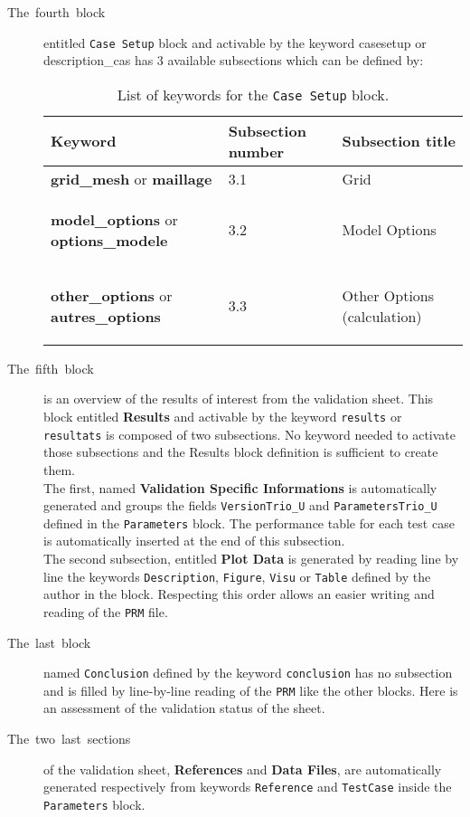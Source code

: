 \begin{description}
\item [{The~fourth~block}] entitled \texttt{Case Setup} block and activable
by the keyword casesetup or description\_cas has 3 available subsections
which can be defined by:\smallskip\newline
\begin{table}[H]
\begin{centering}
\begin{tabular*}{16cm}{m{4.5cm} m{3cm} m{7.5cm}}
\hline 
\textbf{Keyword} & \textbf{Subsection number} & \textbf{Subsection title}\tabularnewline
\hline 
\textbf{grid\_mesh} or \textbf{maillage} & 3.1 & Grid\tabularnewline
\begin{flushleft}\textbf{model\_options} or \textbf{options\_modele}\end{flushleft} & 3.2 & Model Options\tabularnewline
\begin{flushleft}\textbf{other\_options} or \textbf{autres\_options}\end{flushleft} & 3.3 & Other Options (calculation)\tabularnewline
\hline 
\end{tabular*}
\par\end{centering}
\caption{\label{tab:List-of-keyword-casesetup}List of keywords for the \texttt{Case Setup} block.}
\end{table}

\item [{The~fifth~block}] is an overview of the results of interest from
the validation sheet. This block entitled \textbf{Results} and activable
by the keyword \texttt{results} or \texttt{resultats} is composed
of two subsections. No keyword needed to activate those subsections
and the Results block definition is sufficient to create them.\\
The first, named \textbf{Validation Specific Informations} is automatically
generated and groups the fields \texttt{VersionTrio\_U} and \texttt{ParametersTrio\_U}
defined in the \texttt{Parameters} block. The performance table for
each test case is automatically inserted at the end of this subsection.\\
The second subsection, entitled \textbf{Plot Data} is generated by
reading line by line the keywords \texttt{Description}, \texttt{Figure},
\texttt{Visu} or \texttt{Table} defined by the author in the block.
Respecting this order allows an easier writing and reading of the \texttt{PRM}
file.

\item [{The~last~block}] named \texttt{Conclusion} defined by the keyword
\texttt{conclusion} has no subsection and is filled by line-by-line
reading of the \texttt{PRM} like the other blocks. Here is an assessment
of the validation status of the sheet.

\item [{The~two~last~sections}] of the validation sheet, \textbf{References}
and \textbf{Data Files}, are automatically generated respectively
from keywords \texttt{Reference} and \texttt{TestCase} inside the
\texttt{Parameters} block.\medskip\newline
\end{description}
